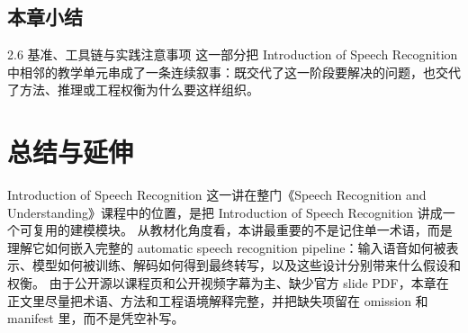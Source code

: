 \documentclass[a4paper]{article}
\begin{document}
\subsection{本章小结}
2.6 基准、工具链与实践注意事项 这一部分把 Introduction of Speech Recognition 中相邻的教学单元串成了一条连续叙事：既交代了这一阶段要解决的问题，也交代了方法、推理或工程权衡为什么要这样组织。

\section{总结与延伸}
Introduction of Speech Recognition 这一讲在整门《Speech Recognition and Understanding》课程中的位置，是把 Introduction of Speech Recognition 讲成一个可复用的建模模块。
从教材化角度看，本讲最重要的不是记住单一术语，而是理解它如何嵌入完整的 automatic speech recognition pipeline：输入语音如何被表示、模型如何被训练、解码如何得到最终转写，以及这些设计分别带来什么假设和权衡。
由于公开源以课程页和公开视频字幕为主、缺少官方 slide PDF，本章在正文里尽量把术语、方法和工程语境解释完整，并把缺失项留在 omission 和 manifest 里，而不是凭空补写。
\end{document}
